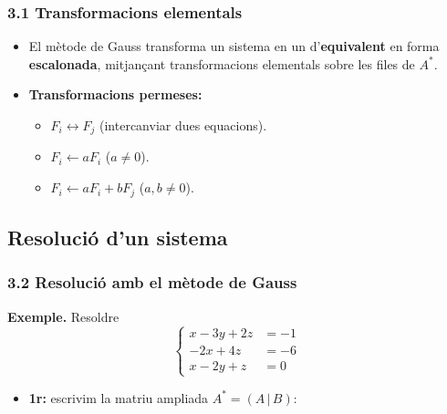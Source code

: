 \documentclass[aspectratio=169]{beamer}
\begin{document}
\begin{frame}[t]
  \frametitle{3.1 Transformacions elementals}

  \vspace{-0.22cm}
  \begin{itemize}
    \item<1-> El mètode de Gauss transforma un sistema en un d'\textbf{equivalent}
      en forma \textbf{escalonada}, mitjançant transformacions elementals
      sobre les files de $A^*$.
    \item<2-> \textbf{Transformacions permeses:}
      \begin{itemize}
        \item $F_i \leftrightarrow F_j$ \;(intercanviar dues equacions).
        \item $F_i \leftarrow a F_i$ \;($a\neq 0$).
        \item $F_i \leftarrow a F_i + b F_j$ \;($a,b\neq 0$).
      \end{itemize}
  \end{itemize}

  \vspace{0.1cm}
\end{frame}

\subsection{Resolució d'un sistema}

\begin{frame}[t]
  \frametitle{3.2 Resolució amb el mètode de Gauss}

  \vspace{-0.28cm}
  \textbf{Exemple.} Resoldre
  \[
    \left\{\begin{aligned}
      x - 3y + 2z &= -1 \\
      -2x + 4z &= -6 \\
      x - 2y + z &= 0
    \end{aligned}\right.
  \]

  \vspace{0.05cm}
  \begin{itemize}
    \item<2-> \textbf{1r:} escrivim la matriu ampliada $A^*=(A\,|\,B)$:
  \end{itemize}
\end{frame}
\end{document}
